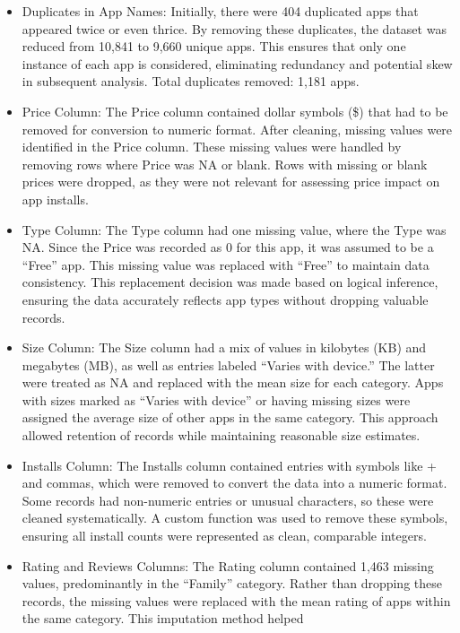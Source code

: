 \documentclass[
]{article}
\begin{document}
\begin{itemize}
\item
  Duplicates in App Names: Initially, there were 404 duplicated apps
  that appeared twice or even thrice. By removing these duplicates, the
  dataset was reduced from 10,841 to 9,660 unique apps. This ensures
  that only one instance of each app is considered, eliminating
  redundancy and potential skew in subsequent analysis. Total duplicates
  removed: 1,181 apps.
\item
  Price Column: The Price column contained dollar symbols (\$) that had
  to be removed for conversion to numeric format. After cleaning,
  missing values were identified in the Price column. These missing
  values were handled by removing rows where Price was NA or blank. Rows
  with missing or blank prices were dropped, as they were not relevant
  for assessing price impact on app installs.
\item
  Type Column: The Type column had one missing value, where the Type was
  NA. Since the Price was recorded as 0 for this app, it was assumed to
  be a ``Free'' app. This missing value was replaced with ``Free'' to
  maintain data consistency. This replacement decision was made based on
  logical inference, ensuring the data accurately reflects app types
  without dropping valuable records.
\item
  Size Column: The Size column had a mix of values in kilobytes (KB) and
  megabytes (MB), as well as entries labeled ``Varies with device.'' The
  latter were treated as NA and replaced with the mean size for each
  category. Apps with sizes marked as ``Varies with device'' or having
  missing sizes were assigned the average size of other apps in the same
  category. This approach allowed retention of records while maintaining
  reasonable size estimates.
\item
  Installs Column: The Installs column contained entries with symbols
  like + and commas, which were removed to convert the data into a
  numeric format. Some records had non-numeric entries or unusual
  characters, so these were cleaned systematically. A custom function
  was used to remove these symbols, ensuring all install counts were
  represented as clean, comparable integers.
\item
  Rating and Reviews Columns: The Rating column contained 1,463 missing
  values, predominantly in the ``Family'' category. Rather than dropping
  these records, the missing values were replaced with the mean rating
  of apps within the same category. This imputation method helped

\end{itemize}
\end{document}
